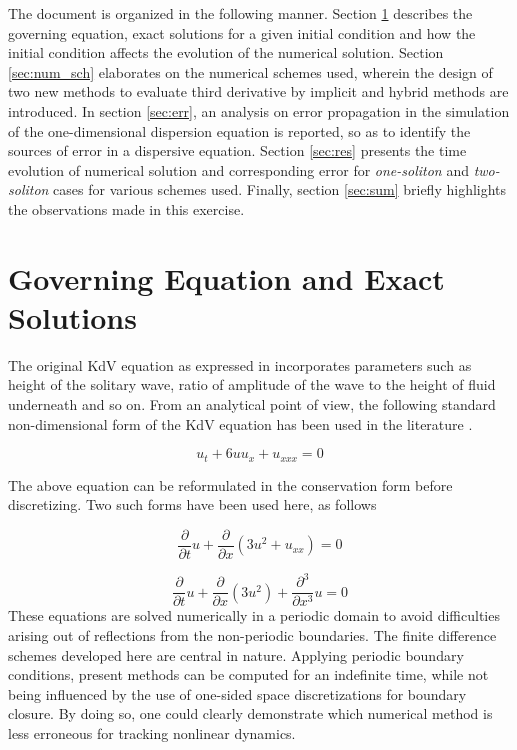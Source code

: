 \documentclass{svjour3}                    %
\begin{document}
The document is organized in the following manner. Section \ref{sec:goveq} describes the governing equation, exact solutions for a given initial condition and how the initial condition affects the evolution of the numerical solution. Section \ref{sec:num_sch} elaborates on the numerical schemes used, wherein the design of two new methods to evaluate third derivative by implicit and hybrid methods are introduced. In section \ref{sec:err}, an analysis on error propagation in the simulation of the one-dimensional dispersion equation is reported, so as to identify the sources of error in a dispersive equation. Section \ref{sec:res} presents the time evolution of numerical solution and corresponding error for \emph{one-soliton} and \emph{two-soliton} cases for various schemes used. Finally, section \ref{sec:sum} briefly highlights the observations made in this exercise.
\section{Governing Equation and Exact Solutions}
\label{sec:goveq}
The original KdV equation as expressed in \cite{Informa} incorporates parameters such as height of the solitary wave, ratio of amplitude of the wave to the height of fluid underneath and so on. From an analytical point of view, the following standard non-dimensional form of the KdV equation has been used in the literature \cite{Taha1984}.

\begin{equation}
\label{eq:kdv}
u_t + 6 uu_x + u_{xxx} = 0
\end{equation}

The above equation can be reformulated in the conservation form before discretizing. Two such forms have been used here, as follows

\begin{equation}
\label{eq:ckdv1}
\frac{\partial}{\partial t}u + \frac{\partial}{\partial x} \left(3 u^2 + u_{xx}\right) = 0
\end{equation}

\begin{equation}
\label{eq:ckdv2}
\frac{\partial}{\partial t}u +  \frac{\partial}{\partial x}(3u^2) + \frac{\partial^3}{\partial x^3}u = 0
\end{equation}
These equations are solved numerically in a periodic domain to avoid difficulties arising out of reflections from the non-periodic boundaries. The finite difference schemes developed here are central in nature. Applying periodic boundary conditions, present methods can be computed for an indefinite time, while not being influenced by the use of one-sided space discretizations for boundary closure. By doing so, one could clearly demonstrate which numerical method is less erroneous for tracking nonlinear dynamics.
\end{document}
